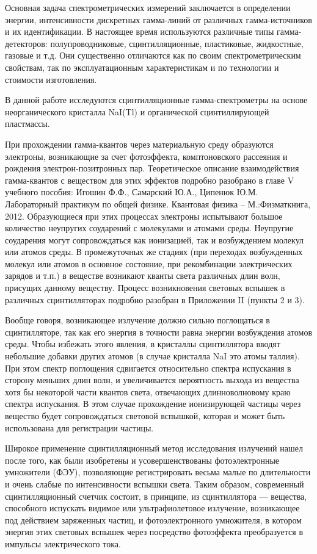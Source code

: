 Основная задача спектрометрических измерений заключается в определении энергии,
интенсивности дискретных гамма-линий от различных гамма-источников и их
идентификации. В настоящее время используются различные типы гамма-детекторов:
полупроводниковые, сцинтилляционные, пластиковые, жидкостные, газовые и т.д. Они
существенно отличаются как по своим спектрометрическим свойствам, так по
эксплуатационным характеристикам и по технологии и стоимости изготовления.

В данной работе исследуются сцинтилляционные гамма-спектрометры на основе
неорганического кристалла NaI(Tl) и органической сцинтиллирующей пластмассы.

При прохождении гамма-квантов через материальную среду образуются электроны,
возникающие за счет фотоэффекта, комптоновского рассеяния и рождения
электрон-позитронных пар. Теоретическое описание взаимодействия гамма-квантов с
веществом для этих эффектов подробно разобрано в главе V учебного пособия:
Игошин Ф.Ф., Самарский Ю.А., Ципенюк Ю.М. Лабораторный практикум по общей
физике. Квантовая физика – М.:Физматкнига, 2012. Образующиеся при этих процессах
электроны испытывают большое количество неупругих соударений с молекулами и
атомами среды. Неупругие соударения могут сопровождаться как ионизацией, так и
возбуждением молекул или атомов среды. В промежуточных же стадиях (при переходах
возбужденных молекул или атомов в основное состояние, при рекомбинации
электрических зарядов и т.п.) в веществе возникают кванты света различных длин
волн, присущих данному веществу. Процесс возникновения световых вспышек в
различных сцинтилляторах подробно разобран в Приложении II (пункты 2 и 3).

Вообще говоря, возникающее излучение должно сильно поглощаться в сцинтилляторе,
так как его энергия в точности равна энергии возбуждения атомов среды. Чтобы
избежать этого явления, в кристаллы сцинтиллятора вводят небольшие добавки
других атомов (в случае кристалла NaI это атомы таллия). При этом спектр
поглощения сдвигается относительно спектра испускания в сторону меньших длин
волн, и увеличивается вероятность выхода из вещества хотя бы некоторой части
квантов света, отвечающих длинноволновому краю спектра испускания. В этом случае
прохождение ионизирующей частицы через вещество будет сопровождаться световой
вспышкой, которая и может быть использована для регистрации частицы.

Широкое применение сцинтилляционный метод исследования излучений нашел после
того, как были изобретены и усовершенствованы фотоэлектронные умножители (ФЭУ),
позволяющие регистрировать весьма малые по длительности и очень слабые по
интенсивности вспышки света. Таким образом, современный сцинтилляционный счетчик
состоит, в принципе, из сцинтиллятора — вещества, способного испускать видимое
или ультрафиолетовое излучение, возникающее под действием заряженных частиц, и
фотоэлектронного умножителя, в котором энергия этих световых вспышек через
посредство фотоэффекта преобразуется в импульсы электрического тока.

